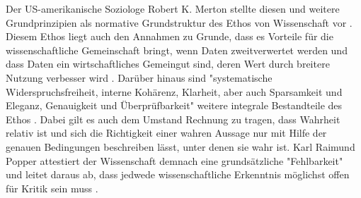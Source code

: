 Der US-amerikanische Soziologe Robert K. Merton stellte diesen und weitere Grundprinzipien als normative Grundstruktur des Ethos von Wissenschaft vor \cite{Merton_1985}. Diesem Ethos liegt auch den Annahmen zu Grunde, dass es Vorteile für die wissenschaftliche Gemeinschaft bringt, wenn Daten zweitverwertet werden und dass Daten ein wirtschaftliches Gemeingut sind, deren Wert durch breitere Nutzung verbesser wird \cite{RIN_2010_open_research}. Darüber hinaus sind "systematische Widerspruchsfreiheit, interne Kohärenz, Klarheit, aber auch Sparsamkeit und Eleganz, Genauigkeit und Überprüfbarkeit" weitere integrale Bestandteile des Ethos \cite{Oezmen_2015}. Dabei gilt es auch dem Umstand Rechnung zu tragen, dass Wahrheit relativ ist und sich die Richtigkeit einer wahren Aussage nur mit Hilfe der genauen Bedingungen beschreiben lässt, unter denen sie wahr ist. Karl Raimund Popper attestiert der Wissenschaft demnach eine grundsätzliche "Fehlbarkeit" und leitet daraus ab, dass jedwede wissenschaftliche Erkenntnis möglichst offen für Kritik sein muss \cite{popper_2005_logic}.

